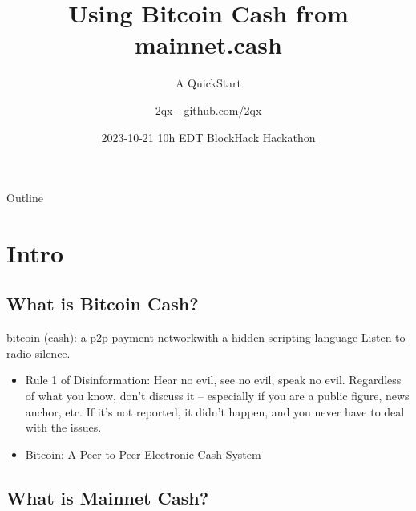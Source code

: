 \documentclass{beamer}
\title[BlockHack Toronto '23] %
{Using Bitcoin Cash from mainnet.cash}
\subtitle
{A QuickStart} %
\author[] %
{2qx - github.com/2qx}
\date[BlockHack TO] %
{2023-10-21 10h EDT 
BlockHack Hackathon}
\begin{document}
\begin{frame}
  \titlepage
\end{frame}

\begin{frame}{Outline}
  \tableofcontents
\end{frame}




\section{Intro}


\subsection[Bitcoin Cash (BCH)]{What is Bitcoin Cash?}

\begin{frame}{bitcoin (cash): a p2p payment network}{with a hidden scripting language}
  Listen to radio silence.
  \begin{itemize}
    \item
    Rule 1 of Disinformation: Hear no evil, see no evil, speak no evil. Regardless of what you know, don't discuss it -- especially if you are a public figure, news anchor, etc. If it's not reported, it didn't happen, and you never have to deal with the issues.
\item
\href{https://awesomebitcoin.cash/\#whitepaper}{Bitcoin: A Peer-to-Peer Electronic Cash System}
  \end{itemize}
 
\end{frame}




\subsection[Mainnet Cash]{What is Mainnet Cash?}
\end{document}
